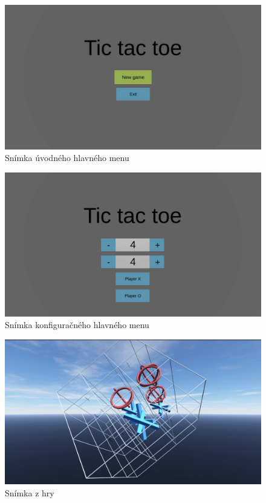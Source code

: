 \begin{figure}[H]
    \centering
    \includegraphics[width=1\textwidth]{images/screenshot-mm-1.jpg}
    \caption{Snímka úvodného hlavného menu}
\end{figure}

\begin{figure}[H]
    \centering
    \includegraphics[width=1\textwidth]{images/screenshot-mm-2.jpg}
    \caption{Snímka konfiguračného hlavného menu}
\end{figure}

\begin{figure}[H]
    \centering
    \includegraphics[width=1\textwidth]{images/screenshot-game-1.jpg}
    \caption{Snímka z hry}
\end{figure}

